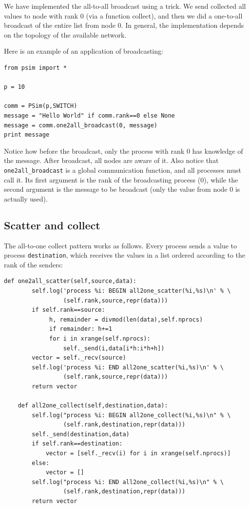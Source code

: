 \documentclass[justified,sixbynine]{tufte-book}
\def\ft{\small\tt}
\theoremstyle{plain}%
\theoremstyle{definition}
\theoremstyle{remark}
\begin{document}
\begin{fullwidth}
We have implemented the all-to-all broadcast using a trick. We send collected all values to node with rank 0 (via a function collect), and then we did a one-to-all broadcast of the entire list from node 0. In general, the implementation depends on the topology of the available network.

Here is an example of an application of broadcasting:

\begin{lstlisting}
from psim import *

p = 10

comm = PSim(p,SWITCH)
message = "Hello World" if comm.rank==0 else None
message = comm.one2all_broadcast(0, message)
print message
\end{lstlisting}

Notice how before the broadcast, only the process with rank 0 has knowledge of the message. After broadcast, all nodes are aware of it. Also notice that {\ft one2all\_broadcast} is a global communication function, and all processes must call it. Its first argument is the rank of the broadcasting process (0), while the second argument is the message to be broadcast (only the value from node 0 is actually used).

\goodbreak\subsection{Scatter and collect}

The all-to-one collect pattern works as follows. Every process sends a value to process {\ft destination}, which receives the values in a list ordered according to the rank of the senders:

\begin{lstlisting}[caption={in file: {\ft psim.py}}]
    def one2all_scatter(self,source,data):
        self.log('process %i: BEGIN all2one_scatter(%i,%s)\n' % \
                 (self.rank,source,repr(data)))
        if self.rank==source:
             h, remainder = divmod(len(data),self.nprocs)
             if remainder: h+=1
             for i in xrange(self.nprocs):
                 self._send(i,data[i*h:i*h+h])
        vector = self._recv(source)
        self.log('process %i: END all2one_scatter(%i,%s)\n' % \
                 (self.rank,source,repr(data)))
        return vector

    def all2one_collect(self,destination,data):
        self.log("process %i: BEGIN all2one_collect(%i,%s)\n" % \
                 (self.rank,destination,repr(data)))
        self._send(destination,data)
        if self.rank==destination:
            vector = [self._recv(i) for i in xrange(self.nprocs)]
        else:
            vector = []
        self.log("process %i: END all2one_collect(%i,%s)\n" % \
                 (self.rank,destination,repr(data)))
        return vector
\end{lstlisting}


\end{fullwidth}
\end{document}
